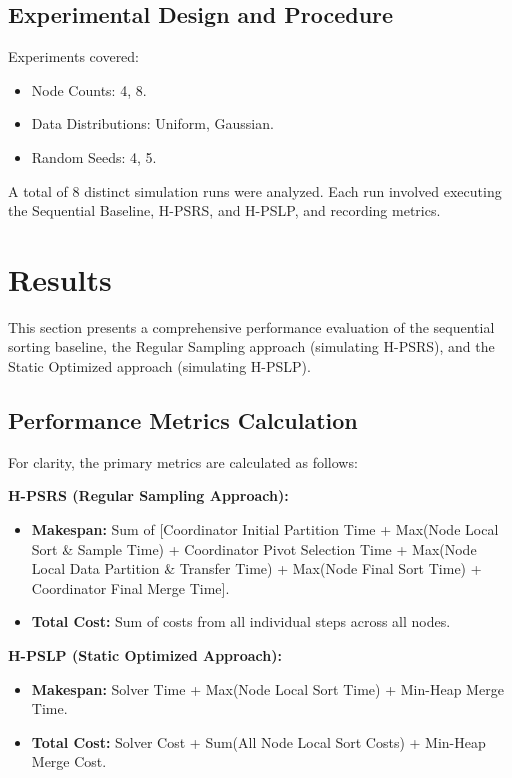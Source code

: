 \documentclass[]{interact}
\theoremstyle{plain}
\theoremstyle{definition}
\theoremstyle{remark}
\begin{document}
\subsection{Experimental Design and Procedure}
Experiments covered:
\begin{itemize}
    \item Node Counts: 4, 8.
    \item Data Distributions: Uniform, Gaussian.
    \item Random Seeds: 4, 5.
\end{itemize}
A total of 8 distinct simulation runs were analyzed. Each run involved executing the Sequential Baseline, H-PSRS, and H-PSLP, and recording metrics.

\section{Results}
\label{sec:results}

This section presents a comprehensive performance evaluation of the sequential sorting baseline, the Regular Sampling approach (simulating H-PSRS), and the Static Optimized approach (simulating H-PSLP).

\subsection{Performance Metrics Calculation}

For clarity, the primary metrics are calculated as follows:

\textbf{H-PSRS (Regular Sampling Approach):}
\begin{itemize}
    \item \textbf{Makespan:} Sum of [Coordinator Initial Partition Time + Max(Node Local Sort \& Sample Time) + Coordinator Pivot Selection Time + Max(Node Local Data Partition \& Transfer Time) + Max(Node Final Sort Time) + Coordinator Final Merge Time].
    \item \textbf{Total Cost:} Sum of costs from all individual steps across all nodes.
\end{itemize}

\textbf{H-PSLP (Static Optimized Approach):}
\begin{itemize}
    \item \textbf{Makespan:} Solver Time + Max(Node Local Sort Time) + Min-Heap Merge Time.
    \item \textbf{Total Cost:} Solver Cost + Sum(All Node Local Sort Costs) + Min-Heap Merge Cost.
\end{itemize}
\end{document}
